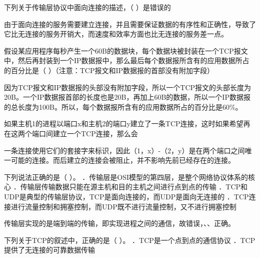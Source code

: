\question 下列关于传输层协议中面向连接的描述，（ ）是错误的
\par{}
\begin{solution}由于面向连接的服务需要建立连接，并且需要保证数据的有序性和正确性，导致了它比无连接的服务开销大，而速度和效率方面也比无连接的服务差一点。
\end{solution}
\question 假设某应用程序每秒产生一个60B的数据块，每个数据块被封装在一个TCP报文中，然后再封装到一个IP数据报中，那么最后每个数据报所含有的应用数据所占的百分比是（
）（注意：TCP报文和IP数据报的首部没有附加字段）
\par{}
\begin{solution}因为TCP报文和IP数据报的头部没有附加字段，所以一个TCP报文的头部长度为20B。一个IP数据报首部的长度也是20B，再加上60B的数据，所以一个IP数据报的总长度为100B。所以，每个数据报所含有的应用数据所占的百分比是60\%。
\end{solution}
\question 如果主机1的进程以端口x和主机2的端口y建立了一条TCP连接，这时如果希望再在这两个端口间建立一个TCP连接，那么会
\par{}
\begin{solution}一条连接使用它们的套接字来标识，因此（1，x）-（2，y）是在两个端口之间唯一可能的连接。而后建立的连接会被阻止，并不影响先前已经存在的连接。
\end{solution}
\question 下列说法正确的是（ ）。
．传输层是OSI模型的第四层，是整个网络协议体系的核心
．传输层传输数据只能在源主机和目的主机之间进行点到点的传输
．TCP和UDP是典型的传输层协议，TCP是面向连接的，而UDP是面向无连接的
．TCP连接进行流量控制和拥塞控制，而UDP既不进行流量控制，又不进行拥塞控制
\par{}
\begin{solution}传输层实现的是端到端的传输，即实现进程之间的通信，故错误，、、正确。
\end{solution}
\question 下列关于TCP的叙述中，正确的是（ ）。 ．TCP是一个点到点的通信协议
．TCP提供了无连接的可靠数据传输
